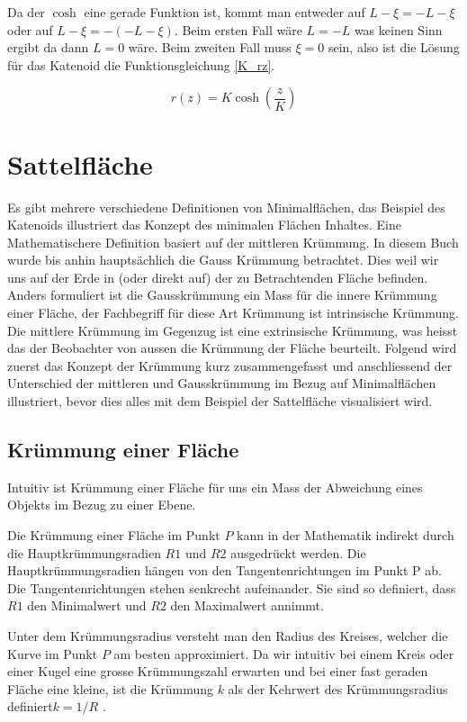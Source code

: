 \begin{refsection}
Da der $\cosh$ eine gerade Funktion ist, kommt man entweder auf $L-\xi=-L-\xi$ oder auf $L-\xi=-(-L-\xi)$.
Beim ersten Fall wäre $L=-L$ was keinen Sinn ergibt da dann $L=0$ wäre. Beim zweiten Fall muss $\xi=0$ sein, also ist die Lösung für das Katenoid die Funktionsgleichung \eqref{K_rz}.

\begin{equation} \label{K_rz}
r(z)=K \cosh\left(\frac{z}{K}\right)
\end{equation}

\section{Sattelfläche}
Es gibt mehrere verschiedene Definitionen von Minimalflächen, das Beispiel des Katenoids illustriert das Konzept des minimalen Flächen Inhaltes. 
Eine Mathematischere Definition basiert auf der mittleren Krümmung. 
In diesem Buch wurde bis anhin hauptsächlich die Gauss Krümmung betrachtet. 
Dies weil wir uns auf der Erde in (oder direkt auf) der zu Betrachtenden Fläche befinden. 
Anders formuliert ist die Gausskrümmung ein Mass für die innere Krümmung einer Fläche, der Fachbegriff für diese Art Krümmung ist intrinsische Krümmung. 
Die mittlere Krümmung im Gegenzug ist eine extrinsische Krümmung, was heisst das der Beobachter von aussen die Krümmung der Fläche beurteilt.
Folgend wird zuerst das Konzept der Krümmung kurz zusammengefasst und anschliessend der Unterschied der mittleren und Gausskrümmung im Bezug auf Minimalflächen illustriert, bevor dies alles mit dem Beispiel der Sattelfläche visualisiert wird.


\subsection{Krümmung einer Fläche}

Intuitiv ist Krümmung einer Fläche für uns ein Mass der Abweichung eines Objekts im Bezug zu einer Ebene. 

Die Krümmung einer Fläche im Punkt $P$ kann in der Mathematik indirekt durch die Hauptkrümmungsradien $R1$ und $R2$ ausgedrückt werden. 
Die Hauptkrümmungsradien hängen von den Tangentenrichtungen im Punkt P ab. 
Die Tangentenrichtungen stehen senkrecht aufeinander.
Sie sind so definiert, dass $R1$ den Minimalwert und $R2$ den Maximalwert annimmt.

Unter dem Krümmungsradius versteht man den Radius des Kreises, welcher die Kurve im Punkt $P$ am besten approximiert. 
Da wir intuitiv bei einem Kreis oder einer Kugel eine grosse Krümmungszahl erwarten und bei einer fast geraden Fläche eine kleine, ist die Krümmung $k$  als der Kehrwert des Krümmungsradius definiert$k=1/R$ . 


\end{refsection}
